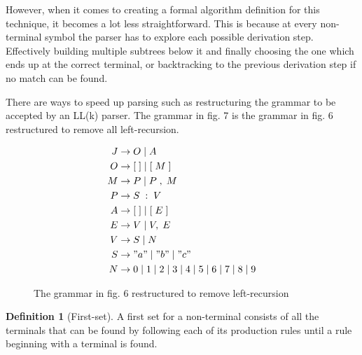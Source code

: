 \documentclass[12pt, letterpaper]{article}
\theoremstyle{definition}
\newtheorem{definition}{Definition}[subsubsection]
\begin{document}
However, when it comes to creating a formal algorithm definition for this technique, it becomes a lot less straightforward. This is because at every non-terminal symbol the parser has to explore each possible derivation step. Effectively building multiple subtrees below it and finally choosing the one which ends up at the correct terminal, or backtracking to the previous derivation step if no match can be found.

There are ways to speed up parsing such as restructuring the grammar to be accepted by an LL(k) parser. The grammar in fig. 7 is the grammar in fig. 6 restructured to remove all left-recursion.

\begin{figure}[h]
    \begin{center}
        \begin{equation}
            \begin{split}
                J &\rightarrow O\;|\;A\\
                O &\rightarrow [\;]\;|\;[\;M\;]\\
                M &\rightarrow P\;|\;P\;,\;M\\
                P &\rightarrow S\;:\;V\\
                A &\rightarrow [\;]\;|\;[\;E\;]\\
                E &\rightarrow V\;|\;V,\;E\\
                V &\rightarrow	S\;|\;N\\
                S &\rightarrow	"a"\;|\;"b"\;|\;"c"\\
                N &\rightarrow 0\;|\;1\;|\;2\;|\;3\;|\;4\;|\;5\;|\;6\;|\;7\;|\;8\;|\;9
            \end{split}
            \nonumber
        \end{equation}
    \end{center}
    \vspace{-1em}
    \caption{The grammar in fig. 6 restructured to remove left-recursion}
\end{figure}

\begin{definition}[First-set]
    A first set for a non-terminal consists of all the terminals that can be found by following each of its production rules until a rule beginning with a terminal is found.
\end{definition}
\end{document}
